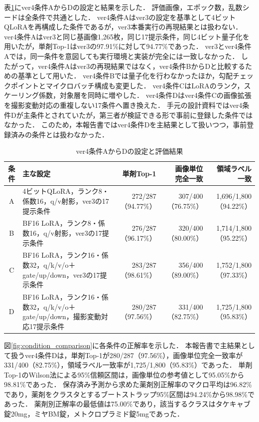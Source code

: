 \documentclass[uplatex,dvipdfmx]{jsarticle}
\begin{document}
表\ref{tab:conditions}にver4条件AからDの設定と結果を示した．
評価画像，エポック数，乱数シードは全条件で共通とした．
ver4条件Aはver3の設定を基準として4ビットQLoRAを再構成した条件であるが，ver3本番実行の再現結果とは扱わない．
ver4条件Aはver3と同じ基画像1,265枚，同じ17提示条件，同じ4ビット量子化を用いたが，単剤Top-1はver3の97.91\%に対して94.77\%であった．
ver3とver4条件Aでは，同一条件を意図しても実行環境と実装が完全には一致しなかった．
したがって，ver4条件Aはver3の再現結果ではなく，ver4条件BからDと比較するための基準として用いた．
ver4条件Bでは量子化を行わなかったほか，勾配チェックポイントとマイクロバッチ構成も変更した．
ver4条件CはLoRAのランク，スケーリング係数，対象層を同時に増やした．
ver4条件Dはver4条件Cの画像拡張を撮影変動対応の重複しない17条件へ置き換えた．
手元の設計資料ではver4条件Dが主条件とされていたが，第三者が検証できる形で事前に登録した条件ではなかった．
このため，本報告書ではver4条件Dを主結果として扱いつつ，事前登録済みの条件とは扱わなかった．

\begin{table}[htbp]
  \centering
  \caption{ver4条件AからDの設定と評価結果}
  \label{tab:conditions}
  \small
  \setlength{\tabcolsep}{3pt}
  \begin{tabular}{|c|p{4.3cm}|r|r|r|}
    \hline
    条件 & 主な設定 & 単剤Top-1 & \shortstack{画像単位\\完全一致} & \shortstack{領域ラベル\\一致} \\ \hline
    A & 4ビットQLoRA，ランク8・係数16，q/v射影，ver3の17提示条件 & 272/287（94.77\%） & 307/400（76.75\%） & 1,696/1,800（94.22\%） \\ \hline
    B & BF16 LoRA，ランク8・係数16，q/v射影，ver3の17提示条件 & 276/287（96.17\%） & 320/400（80.00\%） & 1,714/1,800（95.22\%） \\ \hline
    C & BF16 LoRA，ランク16・係数32，q/k/v/o＋gate/up/down，ver3の17提示条件 & 283/287（98.61\%） & 356/400（89.00\%） & 1,752/1,800（97.33\%） \\ \hline
    D & BF16 LoRA，ランク16・係数32，q/k/v/o＋gate/up/down，撮影変動対応17提示条件 & 280/287（97.56\%） & 331/400（82.75\%） & 1,725/1,800（95.83\%） \\ \hline
  \end{tabular}
\end{table}

図\ref{fig:condition_comparison}に各条件の正解率を示した．
本報告書で主結果として扱うver4条件Dは，単剤Top-1が280/287（97.56\%），画像単位完全一致率が331/400（82.75\%），領域ラベル一致率が1,725/1,800（95.83\%）であった．
単剤Top-1のWilson法による95\%信頼区間は，画像単位の参考値として95.05\%から98.81\%であった．
保存済み予測から求めた薬剤別正解率のマクロ平均は96.82\%であり，薬剤をクラスタとするブートストラップ95\%区間は94.24\%から98.98\%であった．
薬剤別正解率の最低値は75.00\%であり，該当するクラスはタケキャブ錠20mg，ミヤBM錠，メトクロプラミド錠5mgであった．
\end{document}
